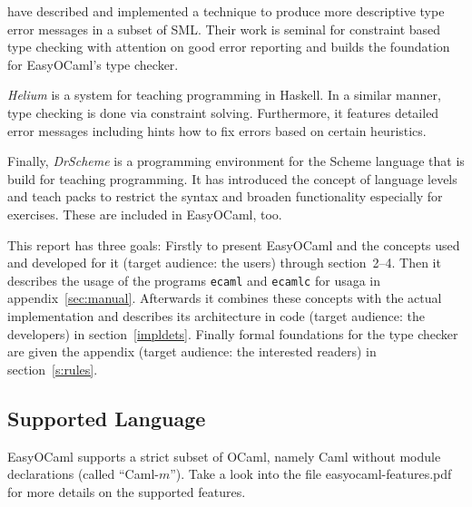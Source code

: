 \citet{haackwells04} have described and implemented a technique 
to produce more descriptive type error messages in a subset of SML.  
Their work is seminal for constraint based type checking with attention 
on good error reporting and builds the foundation for EasyOCaml's type 
checker.

\emph{Helium} \citep{helium-hw03} is a system for teaching programming 
in Haskell. In a similar manner, type checking is done via constraint 
solving. Furthermore, it features detailed error messages including 
hints how to fix errors based on certain heuristics.

Finally, \emph{DrScheme} \citep{Felleisen98thedrscheme} is a programming 
environment for the Scheme language that is build for teaching 
programming.  It has introduced the concept of language levels and teach 
packs to restrict the syntax and broaden functionality especially for 
exercises. These are included in EasyOCaml, too.

This report has three goals:
Firstly to present EasyOCaml and the concepts used and developed for it (target
audience: the users) through section~2--4.
Then it describes the usage of the programs \texttt{ecaml} and \texttt{ecamlc} for usaga in appendix~\ref{sec:manual}.
Afterwards it combines these concepts with the actual implementation and
describes its architecture in code (target audience: the developers) in
section~\ref{impldets}.
Finally formal foundations for the type checker are given the appendix (target
audience: the interested readers) in section~\ref{s:rules}.


\subsection{Supported Language}

\label{hd001001}
EasyOCaml supports a strict subset of OCaml, namely Caml without module 
declarations (called ``Caml-$m$''). Take a look into the file 
easyocaml-features.pdf for more details on the supported features. 
\what

